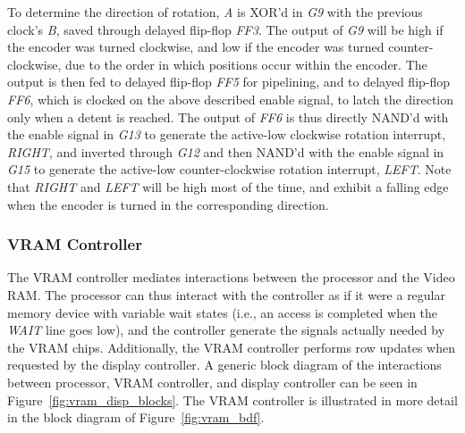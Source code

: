 \documentclass[titlepage]{scrartcl}
\begin{document}
	To determine the direction of rotation, \textit{A} is XOR'd in \textit{G9} with the previous clock's \textit{B}, saved through delayed flip-flop \textit{FF3}. The output of \textit{G9} will be high if the encoder was turned clockwise, and low if the encoder was turned counter-clockwise, due to the order in which positions occur within the encoder. The output is then fed to delayed flip-flop \textit{FF5} for pipelining, and to delayed flip-flop \textit{FF6}, which is clocked on the above described enable signal, to latch the direction only when a detent is reached. The output of \textit{FF6} is thus directly NAND'd with the enable signal in \textit{G13} to generate the active-low clockwise rotation interrupt, \textit{RIGHT}, and inverted through \textit{G12} and then NAND'd with the enable signal in \textit{G15} to generate the active-low counter-clockwise rotation interrupt, \textit{LEFT}. Note that \textit{RIGHT} and \textit{LEFT} will be high most of the time, and exhibit a falling edge when the encoder is turned in the corresponding direction.
	
	\clearpage

	\subsubsection{VRAM Controller \label{sec:vram_ctrl}}
	The VRAM controller mediates interactions between the processor and the Video RAM. The processor can thus interact with the controller as if it were a regular memory device with variable wait states (i.e., an access is completed when the \textit{WAIT} line goes low), and the controller generate the signals actually needed by the VRAM chips. Additionally, the VRAM controller performs row updates when requested by the display controller. A generic block diagram of the interactions between processor, VRAM controller, and display controller can be seen in Figure~\ref{fig:vram_disp_blocks}. The VRAM controller is illustrated in more detail in the block diagram of Figure~\ref{fig:vram_bdf}.\\
\end{document}
